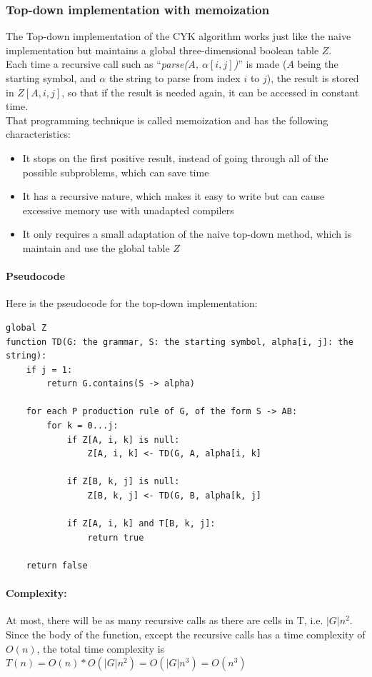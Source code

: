 \documentclass[]{article}
\begin{document}
\begin{multicols}{2}
\subsubsection{Top-down implementation with memoization}
The Top-down implementation of the CYK algorithm works just like the naive implementation but maintains a global three-dimensional boolean table $Z$.\\
Each time a recursive call such as ``\textit{parse($A$, $\alpha[i, j]$)}'' is made ($A$ being the starting symbol, and $\alpha$ the string to parse from index $i$ to $j$), the result is stored in $Z[A,i,j]$, so that if the result is needed again, it can be accessed in constant time.\\
That programming technique is called memoization and has the following characteristics:
\begin{itemize}
  \item It stops on the first positive result, instead of going through all of the possible subproblems, which can save time
  \item It has a recursive nature, which makes it easy to write but can cause excessive memory use with unadapted compilers
  \item It only requires a small adaptation of the naive top-down method, which is maintain and use the global table $Z$
\end{itemize}

\paragraph{Pseudocode} Here is the pseudocode for the top-down implementation:
\begin{lstlisting}
global Z
function TD(G: the grammar, S: the starting symbol, alpha[i, j]: the string):
    if j = 1:
        return G.contains(S -> alpha)

    for each P production rule of G, of the form S -> AB:
        for k = 0...j:
            if Z[A, i, k] is null:
                Z[A, i, k] <- TD(G, A, alpha[i, k]

            if Z[B, k, j] is null:
                Z[B, k, j] <- TD(G, B, alpha[k, j]

            if Z[A, i, k] and T[B, k, j]:
                return true

    return false
\end{lstlisting}

\paragraph{Complexity:}
At most, there will be as many recursive calls as there are cells in T, i.e. $|G|n^2$. Since the body of the function, except the recursive calls has a time complexity of $O(n)$, the total time complexity is $T(n)=O(n)*O(|G|n^2)=O(|G|n^3)=O(n^3)$


\end{multicols}
\end{document}

